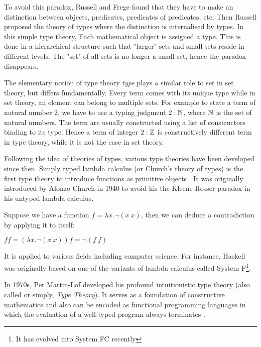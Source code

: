 To avoid this paradox, Russell and Frege found that they have to make an distinction between objects, predicates, predicates of predicates, etc. Then Russell proposed the theory of types \cite{rus:1903} where the distinction is internalised by types.
In this simple type theory, Each mathematical object is assigned a type. This is done in a hierarchical structure such that "larger" sets and small sets reside in different levels. The "set" of all
sets is no longer a small set, hence the
paradox disappears.

The elementary notion of type theory \emph{type} plays a similar role to set in set theory, but differs fundamentally. Every term comes with its unique type while in set theory, an element can belong to multiple sets.
For example to state a term of natural number $2$, we have to use a typing judgment $2:\mathbb{N}$, where $\mathbb{N}$ is the set of natural numbers. The term are usually constructed using a list of constructors binding to its type. Hence a term of integer $2 : \mathbb{Z}$ is constructively different term in type theory, while it is not the case in set theory.

Following the idea of theories of types, various type theories have been developed since then. 
Simply typed lambda calculus (or Church's theory of types) is the first type theory to introduce functions as primitive objects \cite{sep-type-theory}. It was originally introduced by Alonzo Church in 1940 to avoid his
the Kleene-Rosser paradox\cite{kleene1935inconsistency} in his untyped lambda calculus.

\begin{example}
Suppose we have a function $f = \lambda x . \neg (x ~ x) $, then we can deduce a contradiction by applying it to itself:

$f f = (\lambda x . \neg (x ~ x)) f = \neg (f ~ f)$
\end{example}

It is applied to various fields including computer science. For instance, Haskell was originally based on one of the variants of lambda calculus called System F\footnote{It has evolved into System FC recently}. 



In 1970s, Per Martin-L\"{o}f \cite{per:71,per:82} developed his profound intuitionistic type theory (also called \mltt or simply, \emph{Type Theory}).
It serves as a foundation of constructive mathematics \cite{martin1984intuitionistic} and also can be encoded as functional programming languages \cite{DBLP:dblp_journals/tcs/Troelstra99} in
which the evaluation of a well-typed program always terminates \cite{nor:90}. 


